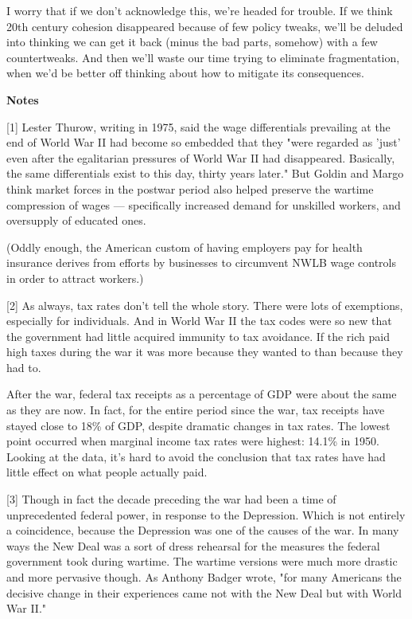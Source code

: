 I worry that if we don't acknowledge this, we're headed for trouble.
If we think 20th century cohesion disappeared because of few policy
tweaks, we'll be deluded into thinking we can get it back (minus
the bad parts, somehow) with a few countertweaks.  And then we'll
waste our time trying to eliminate fragmentation, when we'd be
better off thinking about how to mitigate its consequences.








\textbf{Notes}

[1]
Lester Thurow, writing in 1975, said the wage differentials
prevailing at the end of World War II had become so embedded that
they "were regarded as 'just' even after the egalitarian pressures
of World War II had disappeared.  Basically, the same differentials
exist to this day, thirty years later." But Goldin and Margo think
market forces in the postwar period also helped preserve the wartime
compression of wages --- specifically increased demand for unskilled
workers, and oversupply of educated ones.

(Oddly enough, the American custom of having employers pay for
health insurance derives from efforts by businesses to circumvent
NWLB wage controls in order to attract workers.)

[2]
As always, tax rates don't tell the whole story.  There were
lots of exemptions, especially for individuals.  And in World War
II the tax codes were so new that the government had little acquired
immunity to tax avoidance.  If the rich paid high taxes during the
war it was more because they wanted to than because they had to.

After the war, federal tax receipts as a percentage of GDP were
about the same as they are now. In fact, for the entire period since
the war, tax receipts have stayed close to 18\% of GDP, despite
dramatic changes in tax rates.  The lowest point occurred when
marginal income tax rates were highest: 14.1\% in 1950.  Looking at
the data, it's hard to avoid the conclusion that tax rates have had
little effect on what people actually paid.

[3]
Though in fact the decade preceding the war had been a time
of unprecedented federal power, in response to the Depression.
Which is not entirely a coincidence, because the Depression was one
of the causes of the war.  In many ways the New Deal was a sort of
dress rehearsal for the measures the federal government took during
wartime.  The wartime versions were much more drastic and more
pervasive though.  As Anthony Badger wrote, "for many Americans the
decisive change in their experiences came not with the New Deal but
with World War II."

